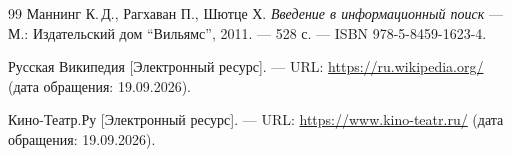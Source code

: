 \begin{thebibliography}{99}
Маннинг К.\,Д., Рагхаван П., Шютце Х.
{\itshape Введение в информационный поиск} --- М.: Издательский дом \enquote{Вильямс},
2011. --- 528 с. --- ISBN 978-5-8459-1623-4.

Русская Википедия [Электронный ресурс]. --- URL:
\href{https://ru.wikipedia.org/}{https://ru.wikipedia.org/} (дата обращения: 19.09.2026).

Кино-Театр.Ру [Электронный ресурс]. --- URL:
\href{https://www.kino-teatr.ru/}{https://www.kino-teatr.ru/} (дата обращения: 19.09.2026).
\end{thebibliography}
